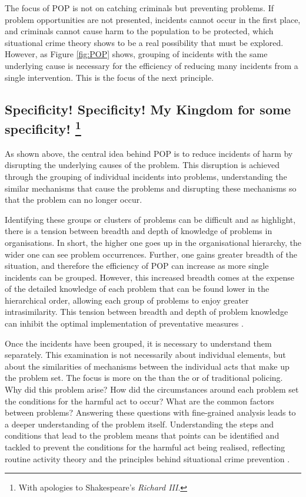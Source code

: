 The focus of POP is not on catching criminals but preventing problems. If problem opportunities are not presented, incidents cannot occur in the first place, and criminals cannot cause harm to the population to be protected, which situational crime theory shows to be a real possibility that must be explored. However, as Figure \ref{fig:POP} shows, grouping of incidents with the same underlying cause is necessary for the efficiency of reducing many incidents from a single intervention.  This is the focus of the next principle. 

 
 
 \subsection[Specificity! Specificity! My Kingdom for some specificity! ]{Specificity! Specificity! My Kingdom for some specificity! \footnote{With apologies to Shakespeare’s \emph{Richard III}.} }


As shown above, the central idea behind POP is to reduce incidents of harm by disrupting the underlying causes of the problem. This disruption is achieved through the grouping of individual incidents into problems, understanding the similar mechanisms that cause the problems and disrupting these mechanisms so that the problem can no longer occur.

Identifying these groups or clusters of problems can be difficult and as \textcite{scott2012implementing} highlight, there is a tension between breadth and depth of knowledge of problems in organisations. In short, the higher one goes up in the organisational hierarchy, the wider one can see problem occurrences. Further, one gains greater breadth of the situation, and therefore the efficiency of POP can increase as more single incidents can be grouped. However, this increased breadth comes at the expense of the detailed knowledge of each problem that can be found lower in the hierarchical order, allowing each group of problems to enjoy greater intrasimilarity. This tension between breadth and depth of problem knowledge can inhibit the optimal implementation of preventative measures \parencite{maguire2015problem}.

Once the incidents have been grouped, it is necessary to understand them separately. This examination is not necessarily about individual elements, but about the similarities of mechanisms between the individual acts that make up the problem set. The focus is more on the  than the  or  of traditional policing. Why did this problem arise? How did the circumstances around each problem set the conditions for the harmful act to occur? What are the common factors between problems? Answering these questions with fine-grained analysis leads to a deeper understanding of the problem itself. Understanding the steps and conditions that lead to the problem means that points can be identified and tackled to prevent the conditions for the harmful act being realised, reflecting routine activity theory and the principles behind situational crime prevention \parencite{felson1998opportunity}.

